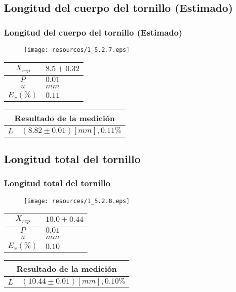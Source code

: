 \documentclass[letter,11pt]{beamer}
\begin{document}
\subsection{Longitud del cuerpo del tornillo (Estimado)}
\begin{frame}
\frametitle{Longitud del cuerpo del tornillo (Estimado)}
\vspace*{0.8cm}
\begin{figure}
\centering
\texttt{[image: resources/1\_5.2.7.eps]}
\end{figure}
\vspace*{0.4cm}
\scriptsize
\begin{tabular}{|c|>{\centering}m{1.8cm}<{\centering}|}
\hline
$X_{rep}$ &  $8.5+0.32$ \tabularnewline \hline
      $P$ &      $0.01$ \tabularnewline \hline
      $u$ &        $mm$ \tabularnewline \hline
$E_x(\%)$ &      $0.11$ \tabularnewline \hline
\end{tabular}
\quad
\begin{tabular}{|c|>{\centering}m{5.7cm}<{\centering}|}
\hline
\multicolumn{2}{|c|}{\textbf{Resultado de la medición}} \\ \hline
$L$ & $( 8.82\pm0.01)[mm], 0.11\%$ \tabularnewline \hline
\end{tabular}
\end{frame}

\subsection{Longitud total del tornillo}
\begin{frame}
\frametitle{Longitud total del tornillo}
\vspace*{0.8cm}
\begin{figure}
\centering
\texttt{[image: resources/1\_5.2.8.eps]}
\end{figure}
\vspace*{0.4cm}
\scriptsize
\begin{tabular}{|c|>{\centering}m{1.8cm}<{\centering}|}
\hline
$X_{rep}$ &  $10.0+0.44$ \tabularnewline \hline
      $P$ &       $0.01$ \tabularnewline \hline
      $u$ &         $mm$ \tabularnewline \hline
$E_x(\%)$ &       $0.10$ \tabularnewline \hline
\end{tabular}
\quad
\begin{tabular}{|c|>{\centering}m{5.7cm}<{\centering}|}
\hline
\multicolumn{2}{|c|}{\textbf{Resultado de la medición}} \\ \hline
$L$ & $(10.44\pm0.01)[mm], 0.10\%$ \tabularnewline \hline
\end{tabular}
\end{frame}
\end{document}
